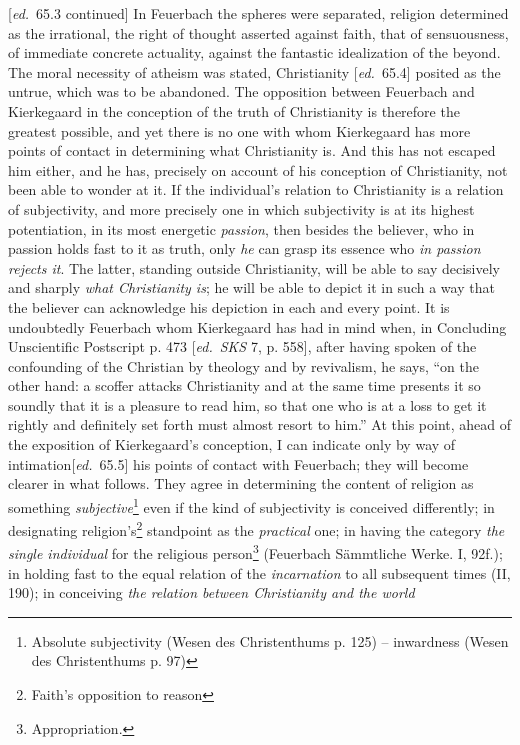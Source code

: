 \documentclass[12pt,a4paper,openany]{book}
\newcommand{\kpage}[1]{\marginnote{\footnotesize\textit{[#1]}}}
\newcommand{\ed}[1]{{\small[\textit{ed.}\ #1]}}
\begin{document}
\ed{65.3 continued} In Feuerbach the spheres were separated, religion
determined as the irrational, the right of thought asserted against faith,
that of sensuousness, of immediate concrete actuality, against
the fantastic idealization of the beyond. The moral
necessity of atheism was stated, Christianity \ed{65.4} posited as the
untrue, which was to be abandoned. The opposition between Feuerbach
and Kierkegaard in the conception of the truth of Christianity is
therefore the greatest possible, and yet there is no one with whom Kierkegaard
has more points of contact in determining what Christianity
is. And this has not escaped him either, and he has,
precisely on account of his conception of Christianity, not been able
to wonder at it. If the individual's relation to Christianity
is a relation of subjectivity, and more precisely one in which subjectivity
is at its highest potentiation, in its most energetic \emph{passion},
then besides the believer, who in passion holds fast to it as
truth, only \emph{he} can grasp its essence who \emph{in passion rejects it}.
The latter, standing outside Christianity, will be able to say decisively and
sharply \emph{what Christianity is}; he will be able to depict it
in such a way that the believer can acknowledge his depiction in each and every point.
It is undoubtedly Feuerbach whom Kierkegaard
has had in mind when, in Concluding Unscientific Postscript p.
473 \ed{\emph{SKS} 7, p. 558}, after having spoken of the confounding of the Christian by theology and by revivalism,
he says, ``on the other hand: a
scoffer attacks Christianity and at the same time presents it
so soundly that it is a pleasure to read him, so that one who is at a loss
to get it rightly and definitely set forth must almost resort to him.''
At this point, ahead of the exposition of Kierkegaard's
conception, I can indicate only by way of intimation\ed{65.5} his points of contact
with Feuerbach; they will become clearer in what follows.
They agree in determining the content of religion as something \emph{subjective}\footnote[21]{Absolute subjectivity (Wesen des Christenthums p. 125) -- inwardness
(Wesen des Christenthums p. 97)}
even if the kind of subjectivity is conceived differently; in designating\kpage{100}
religion's\footnote[22]{Faith's opposition to reason} standpoint as the \emph{practical} one; in having the category
\emph{the single individual} for the religious person\footnote[23]{Appropriation.} (Feuerbach Sämmtliche Werke.
I, 92f.); in holding fast to the equal relation of the \emph{incarnation} to all subsequent
times (II, 190); in conceiving \emph{the relation between Christianity and the world}
\end{document}
